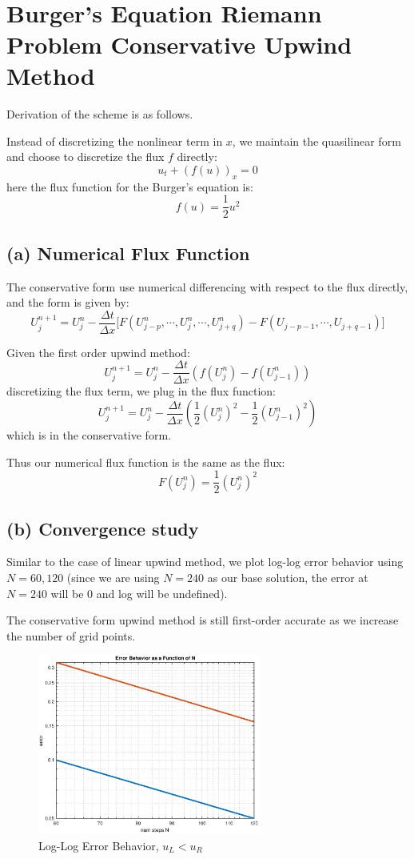 \documentclass[12pt]{article} %
\begin{document}
\
\newpage
\
\section{Burger's Equation Riemann Problem Conservative Upwind Method}
Derivation of the scheme is as follows. 

Instead of discretizing the nonlinear term in $x$, we maintain the quasilinear form and choose to discretize the flux $f$ directly:
$$
	u_t + (f(u))_x = 0
$$ here the flux function for the Burger's equation is:
$$
	f(u) = \frac12 u^2
$$
\subsection{(a) Numerical Flux Function}
The conservative form use numerical differencing with respect to the flux directly, and the form is given by:
$$
	U_{j}^{n+1} = 
	U_{j}^{n} - \frac{\Delta t}{\Delta x} \big[ F(U_{j-p}^{n}, \cdots, U_{j}^{n}, \cdots, 
	U_{j+q}^{n}) - 
	F(U_{j-p-1}, \cdots, U_{j+q-1})\big]
$$

Given the first order upwind method:
$$
	U_{j}^{n+1} = U_{j}^{n} - 
	\frac{\Delta t}{\Delta x} (f(U_{j}^{n}) - f(U_{j-1}^{n}))
$$ discretizing the flux term, we plug in the flux function:
$$
	U_{j}^{n+1} = U_{j}^{n} - 
	\frac{\Delta t}{\Delta x}(\frac12 (U_{j}^{n})^2 - \frac12 (U_{j-1}^{n})^2)
$$ which is in the conservative form.

Thus our numerical flux function is the same as the flux:
$$
	F(U_{j}^n) = \frac12 (U_j^n)^2
$$

\subsection{(b) Convergence study}
Similar to the case of linear upwind method, we plot log-log error behavior using $N = 60, 120$ (since we are using $N=240$ as our base solution, the error at $N=240$ will be 0 and log will be undefined).

The conservative form upwind method is still first-order accurate as we increase the number of grid points. 

\begin{figure}[h!]
\caption{Log-Log Error Behavior, $u_L < u_R$}
\centering
\includegraphics[width=0.65\textwidth]{converge1.eps}
\end{figure}
\end{document}
